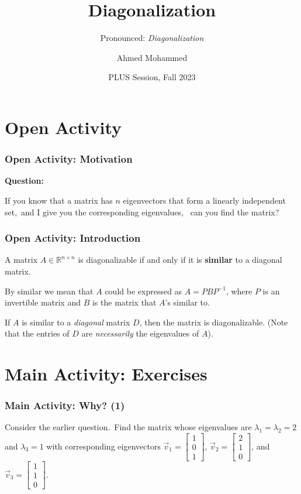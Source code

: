 \documentclass{beamer}
\title{Diagonalization}
\subtitle{Pronounced: \textit{Di\pro{}a\pro{}go\pro{}na\pro{}li\pro{}za\pro{}tion}}
\author{Ahmed Mohammed}
\institute{Georgia Institute of Technology}
\date{PLUS Session, Fall 2023}
\begin{document}
	\begin{frame}
		\maketitle
	\end{frame}

	\section{Open Activity}
	\begin{frame}
		\frametitle{Open Activity: Motivation}
		\textbf{Question:} \pause
		\begin{center}
		If you know that a matrix has \(n\) eigenvectors that form a linearly independent set,\pause \ and I give you the corresponding eigenvalues,\pause
			\ can you find the matrix?
		\end{center}
	\end{frame}

	\begin{frame}
		\frametitle{Open Activity: Introduction}
		\begin{definition}
			A matrix \(A \in \mathbb{R}^{n \times n}\) is diagonalizable if and only if it is \textbf{similar} to a diagonal matrix.
		\end{definition}
		
		By similar we mean that \(A\) could be expressed as \(A = PBP^{-1}\), where \(P\) is an invertible matrix and \(B\) is the matrix that \(A\)'s similar to.
		\pause

		If \(A\) is similar to a \emph{diagonal} matrix \(D\), then the matrix is diagonalizable. (Note that the entries of \(D\) are \emph{necessarily} the
		eigenvalues of \(A\)).
	\end{frame}

	\section{Main Activity: Exercises}
		\begin{frame}
			\frametitle{Main Activity: Why? (1)}

			Consider the earlier question.\pause\  Find the matrix whose eigenvalues are \(\lambda_1 = \lambda_2 = 2\) and \(\lambda_3 = 1\) with 
			corresponding eigenvectors \(\vec{v}_1 = \begin{bmatrix}1 \\ 0 \\ 1\end{bmatrix}\), \(\vec{v}_2 = \begin{bmatrix}2 \\ 1 \\ 0\end{bmatrix}\), 
			and \(\vec{v}_3 = \begin{bmatrix}1 \\ 1 \\ 0\end{bmatrix}\).
		\end{frame}
		
\end{document}
